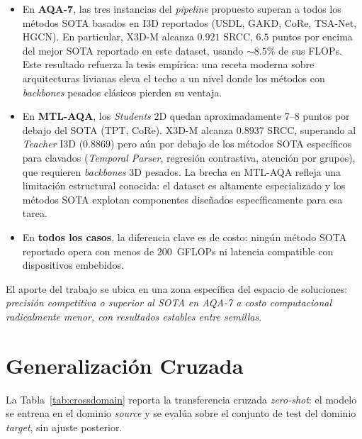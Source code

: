 \begin{itemize}
    \item En \textbf{AQA-7}, las tres instancias del \textit{pipeline} propuesto superan a todos los métodos SOTA basados en \ac{I3D} reportados (USDL, GAKD, CoRe, TSA-Net, HGCN). En particular, X3D-M alcanza $0.921$ \ac{SRCC}, $6.5$ puntos por encima del mejor SOTA reportado en este dataset, usando $\sim 8.5\%$ de sus \ac{FLOPs}. Este resultado refuerza la tesis empírica: una receta moderna sobre arquitecturas livianas eleva el techo a un nivel donde los métodos con \textit{backbones} pesados clásicos pierden su ventaja.
    \item En \textbf{MTL-AQA}, los \textit{Students} 2D quedan aproximadamente 7--8 puntos por debajo del SOTA (TPT, CoRe). X3D-M alcanza $0.8937$ \ac{SRCC}, superando al \textit{Teacher} \ac{I3D} ($0.8869$) pero aún por debajo de los métodos SOTA específicos para clavados (\textit{Temporal Parser}, regresión contrastiva, atención por grupos), que requieren \textit{backbones} 3D pesados. La brecha en MTL-AQA refleja una limitación estructural conocida: el dataset es altamente especializado y los métodos SOTA explotan componentes diseñados específicamente para esa tarea.
    \item En \textbf{todos los casos}, la diferencia clave es de costo: ningún método SOTA reportado opera con menos de 200~GFLOPs ni latencia compatible con dispositivos embebidos.
\end{itemize}

El aporte del trabajo se ubica en una zona específica del espacio de soluciones: \emph{precisión competitiva o superior al SOTA en AQA-7 a costo computacional radicalmente menor, con resultados estables entre semillas}.

\section{Generalización Cruzada}
\label{sec:crossdomain}

La Tabla~\ref{tab:crossdomain} reporta la transferencia cruzada \textit{zero-shot}: el modelo se entrena en el dominio \textit{source} y se evalúa sobre el conjunto de test del dominio \textit{target}, sin ajuste posterior.

